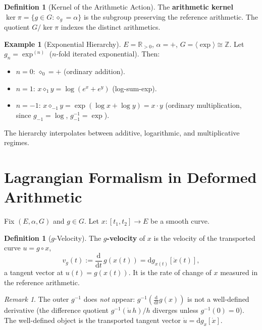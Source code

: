\documentclass[11pt,twocolumn]{article}
\theoremstyle{plain}
\theoremstyle{definition}
\newtheorem{definition}[theorem]{Definition}
\newtheorem{example}[theorem]{Example}
\theoremstyle{remark}
\newtheorem{remark}[theorem]{Remark}
\newcommand{\RR}{\mathbb{R}_{>0}}
\newcommand{\dd}{\mathrm{d}}
\begin{document}
\begin{definition}[Kernel of the Arithmetic Action]\label{def:kernel-arith}
The \textbf{arithmetic kernel} $\ker\pi = \{g \in G : \diamond_g = \alpha\}$ is the subgroup preserving the reference arithmetic. The quotient $G/\ker\pi$ indexes the distinct arithmetics.
\end{definition}

\begin{example}[Exponential Hierarchy]\label{ex:exp}
$E = \RR$, $\alpha = +$, $G = \langle\exp\rangle \cong \mathbb{Z}$. Let $g_n = \exp^{(n)}$ ($n$-fold iterated exponential). Then:
\begin{itemize}
    \item $n = 0$: $\diamond_0 = +$ (ordinary addition).
    \item $n = 1$: $x \diamond_1 y = \log(e^x + e^y)$ (log-sum-exp).
    \item $n = -1$: $x \diamond_{-1} y = \exp(\log x + \log y) = x \cdot y$ (ordinary multiplication, since $g_{-1} = \log$, $g_{-1}^{-1} = \exp$).
\end{itemize}
The hierarchy interpolates between additive, logarithmic, and multiplicative regimes.
\end{example}


\section{Lagrangian Formalism in Deformed Arithmetic}
\label{sec:lagrangian}

Fix $(E, \alpha, G)$ and $g \in G$. Let $x: [t_1, t_2] \to E$ be a smooth curve.

\begin{definition}[$g$-Velocity]\label{def:g-velocity}
The \textbf{$g$-velocity} of $x$ is the velocity of the transported curve $u = g \circ x$,
\begin{equation}
v_g(t) := \frac{\dd}{\dd t}\,g(x(t)) = \dd g_{x(t)}[\dot{x}(t)],
\end{equation}
a tangent vector at $u(t) = g(x(t))$. It is the rate of change of $x$ measured in the reference arithmetic.
\end{definition}

\begin{remark}
The outer $g^{-1}$ does \emph{not} appear: $g^{-1}(\tfrac{\dd}{\dd t}g(x))$ is not a well-defined derivative (the difference quotient $g^{-1}(\dot u\,h)/h$ diverges unless $g^{-1}(0)=0$). The well-defined object is the transported tangent vector $\dot u = \dd g_x[\dot x]$.
\end{remark}
\end{document}
